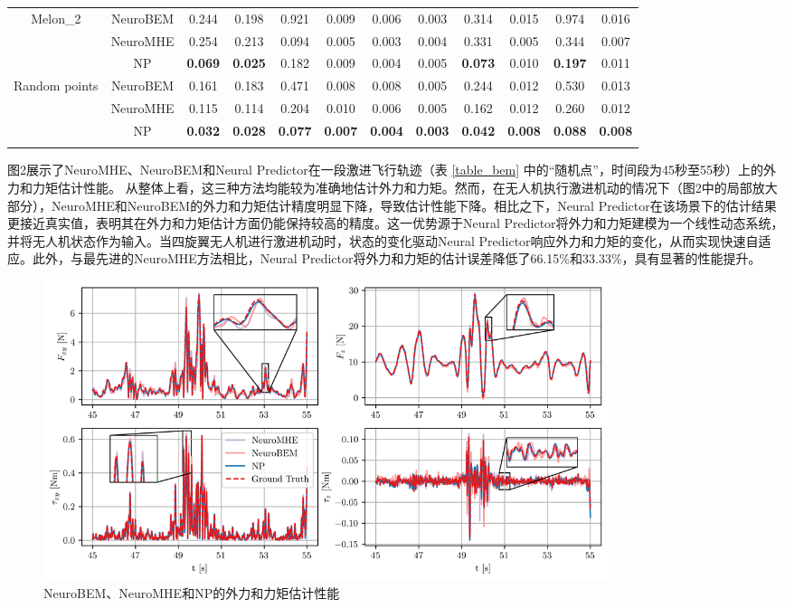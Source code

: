 \documentclass[lang=chs, degree=master, blindreview=true, winfonts=true]{yanputhesis}
\begin{document}
\begin{table}[h]
\begin{tabular}{c c c c c c c c c c c c}
	\hline
	\multirow{3}{*}{Melon\_2} & NeuroBEM & 0.244 & 0.198 & 0.921 & 0.009 & 0.006 & 0.003 & 0.314 & 0.015 & 0.974 & 0.016 \\
	& NeuroMHE & 0.254 & 0.213 & 0.094 & 0.005 & 0.003 & 0.004 & 0.331 & 0.005 & 0.344 & 0.007 \\
	& NP & \textbf{0.069} & \textbf{0.025} & 0.182 & 0.009 & 0.004 & 0.005 & \textbf{0.073} & 0.010 & \textbf{0.197} & 0.011 \\
	\hline
	\multirow{3}{*}{Random points} & NeuroBEM & 0.161 & 0.183 & 0.471 & 0.008 & 0.008 & 0.005 & 0.244 & 0.012 & 0.530 & 0.013 \\
	& NeuroMHE & 0.115 & 0.114 & 0.204 & 0.010 & 0.006 & 0.005 & 0.162 & 0.012 & 0.260 & 0.012 \\
	& NP & \textbf{0.032} & \textbf{0.028} & \textbf{0.077} & \textbf{0.007} & \textbf{0.004} & \textbf{0.003} & \textbf{0.042} & \textbf{0.008} & \textbf{0.088} & \textbf{0.008} \\
	\Xhline{1.pt}
\end{tabular}
\end{table}

图2展示了NeuroMHE、NeuroBEM和Neural Predictor在一段激进飞行轨迹（表 \ref{table_bem} 中的“随机点”，时间段为45秒至55秒）上的外力和力矩估计性能。
从整体上看，这三种方法均能较为准确地估计外力和力矩。然而，在无人机执行激进机动的情况下（图2中的局部放大部分），NeuroMHE和NeuroBEM的外力和力矩估计精度明显下降，导致估计性能下降。相比之下，Neural Predictor在该场景下的估计结果更接近真实值，表明其在外力和力矩估计方面仍能保持较高的精度。这一优势源于Neural Predictor将外力和力矩建模为一个线性动态系统，并将无人机状态作为输入。当四旋翼无人机进行激进机动时，状态的变化驱动Neural Predictor响应外力和力矩的变化，从而实现快速自适应。此外，与最先进的NeuroMHE方法相比，Neural Predictor将外力和力矩的估计误差降低了66.15\%和33.33\%，具有显著的性能提升。

\begin{figure}[hbt!]
	\hspace{-0.6cm}  %
	\centering
	\includegraphics[width=39pc]{picture/bem_comparison.png} 
	\caption{NeuroBEM、NeuroMHE和NP的外力和力矩估计性能} 
	\label{3-5}
\end{figure}
\end{document}
